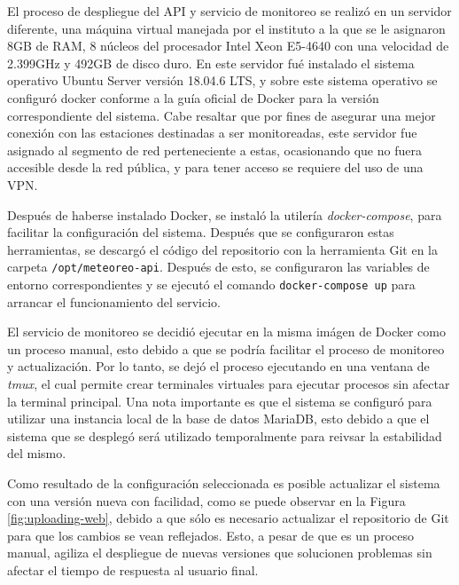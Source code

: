 El proceso de despliegue del API y servicio de monitoreo se realizó en un servidor diferente, una máquina virtual manejada por el instituto a la que se le asignaron 8GB de RAM, 8 núcleos del procesador Intel Xeon E5-4640 con una velocidad de 2.399GHz y 492GB de disco duro. En este servidor fué instalado el sistema operativo Ubuntu Server versión 18.04.6 LTS, y sobre este sistema operativo se configuró docker conforme a la guía oficial de Docker para la versión correspondiente del sistema. Cabe resaltar que por fines de asegurar una mejor conexión con las estaciones destinadas a ser monitoreadas, este servidor fue asignado al segmento de red perteneciente a estas, ocasionando que no fuera accesible desde la red pública, y para tener acceso se requiere del uso de una VPN.

Después de haberse instalado Docker, se instaló la utilería \textit{docker-compose}, para facilitar la configuración del sistema. Después que se configuraron estas herramientas, se descargó el código del repositorio con la herramienta Git en la carpeta \texttt{/opt/meteoreo-api}. Después de esto, se configuraron las variables de entorno correspondientes y se ejecutó el comando \texttt{docker-compose up} para arrancar el funcionamiento del servicio.

El servicio de monitoreo se decidió ejecutar en la misma imágen de Docker como un proceso manual, esto debido a que se podría facilitar el proceso de monitoreo y actualización. Por lo tanto, se dejó el proceso ejecutando en una ventana de \textit{tmux}, el cual permite crear terminales virtuales para ejecutar procesos sin afectar la terminal principal. Una nota importante es que el sistema se configuró para utilizar una instancia local de la base de datos MariaDB, esto debido a que el sistema que se desplegó será utilizado temporalmente para reivsar la estabilidad del mismo.

Como resultado de la configuración seleccionada es posible actualizar el sistema con una versión nueva con facilidad, como se puede observar en la Figura \ref{fig:uploading-web}, debido a que sólo es necesario actualizar el repositorio de Git para que los cambios se vean reflejados. Esto, a pesar de que es un proceso manual, agiliza el despliegue de nuevas versiones que solucionen problemas sin afectar el tiempo de respuesta al usuario final.

